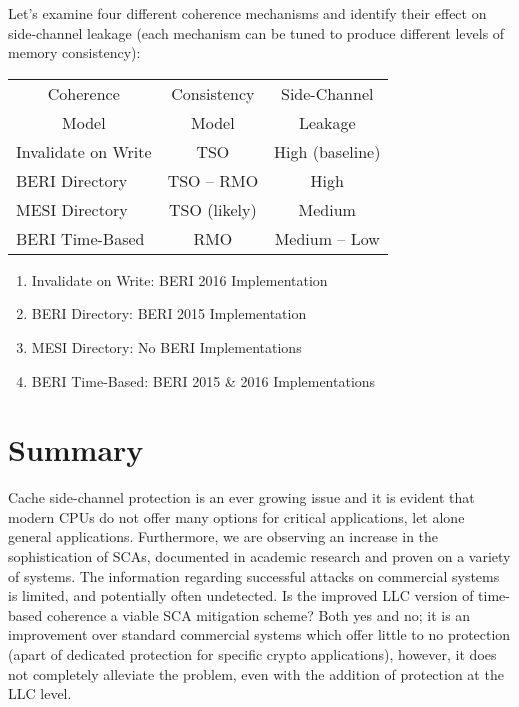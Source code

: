 	Let's examine four different coherence mechanisms and identify their effect on side-channel leakage (each mechanism can be tuned to produce different levels of memory consistency):

	\begin{table}[h]
	\begin{center}
	\begin{tabular}[c]{|l|c|c|}
		\hline
		\multicolumn{1}{|c|}{Coherence} & Consistency & Side-Channel \\
		\multicolumn{1}{|c|}{Model} & Model & Leakage \\
		\hline
		Invalidate on Write & TSO & High (baseline) \\
		BERI Directory & TSO -- RMO & High \\
		MESI Directory & TSO (likely) & Medium \\
		BERI Time-Based & RMO & Medium -- Low \\
		\hline
	\end{tabular}
	\end{center}
	\end{table}
	
	\begin{enumerate}
		\item Invalidate on Write: BERI 2016 Implementation 
		\item BERI Directory: BERI 2015 Implementation
		\item MESI Directory: No BERI Implementations 
		\item BERI Time-Based: BERI 2015 \& 2016 Implementations
	\end{enumerate}




\section{Summary}
	Cache side-channel protection is an ever growing issue and it is evident that modern CPUs do not offer many options for critical applications, let alone general applications. Furthermore, we are observing an increase in the sophistication of SCAs, documented in academic research and proven on a variety of systems. The information regarding successful attacks on commercial systems is limited, and potentially often undetected. 
	Is the improved LLC version of time-based coherence a viable SCA mitigation scheme? Both yes and no; it is an improvement over standard commercial systems which offer little to no protection (apart of dedicated protection for specific crypto applications), however, it does not completely alleviate the problem, even with the addition of protection at the LLC level.
